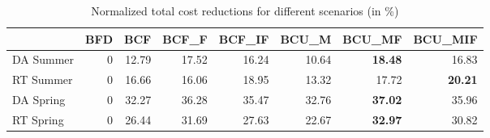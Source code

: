 \begin{table}[ht]
\centering
\begin{tabular}{lrrrrrrr}
\toprule
{} &  BFD &    BCF &  BCF\_F &  BCF\_IF &  BCU\_M &  BCU\_MF &  BCU\_MIF \\
\midrule
DA Summer &    0 &  12.79 &  17.52 &   16.24 &  10.64 &   \textbf{18.48} &    16.83 \\
RT Summer &    0 &  16.66 &  16.06 &   18.95 &  13.32 &   17.72 &    \textbf{20.21} \\
DA Spring &    0 &  32.27 &  36.28 &   35.47 &  32.76 &   \textbf{37.02} &    35.96 \\
RT Spring &    0 &  26.44 &  31.69 &   27.63 &  22.67 &   \textbf{32.97} &    30.82 \\
\bottomrule
\end{tabular}
\caption{Normalized total cost reductions for different scenarios (in \%)}
\end{table}






